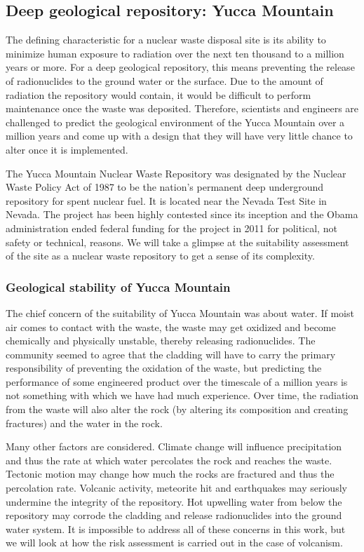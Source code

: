 \documentclass[nofootinbib,preprint,aps]{revtex4-1}
\begin{document}
    \subsection{Deep geological repository: Yucca Mountain}
        The defining characteristic for a nuclear waste disposal site is its ability to minimize human
        exposure to radiation over the next ten thousand to a million years or more.
        For a deep geological repository, this means preventing the release
        of radionuclides to the ground water or the surface.
        Due to the amount of radiation the repository would contain, it would be difficult to perform
        maintenance once the waste was deposited. Therefore, scientists and engineers are challenged
        to predict the geological environment of the Yucca Mountain over a million years and come up
        with a design that they will have very little chance to alter once it is implemented.

        The Yucca Mountain Nuclear Waste Repository was designated by the Nuclear Waste Policy Act
        of 1987 to be the nation's permanent deep underground repository for spent nuclear fuel. It is
        located near the Nevada Test Site in Nevada. The project has been highly contested since its
        inception and the Obama administration ended federal funding for the project in 2011 for political,
        not safety or technical, reasons. We will take a glimpse at the suitability assessment of the site
        as a nuclear waste repository to get a sense of its complexity.
        \subsubsection{Geological stability of Yucca Mountain}
        The chief concern of the suitability of Yucca Mountain was about water. If moist air comes to
        contact with the waste, the waste may get oxidized and become chemically and physically unstable, thereby
        releasing radionuclides.
        The community seemed to agree that the cladding will have to carry the primary
        responsibility of preventing the oxidation of the waste, but predicting the performance of some
        engineered product over the timescale of a million years is not something with which we have had much 
        experience. Over time, the radiation from the waste will also alter the rock (by altering its composition
        and creating fractures) and the water in the rock.\cite{m06}

        Many other factors are considered. Climate change will influence precipitation and thus the
        rate at which water percolates the rock and reaches the waste. 
        Tectonic motion may change how much the rocks are fractured and thus the percolation rate.
        Volcanic activity, meteorite hit and earthquakes may seriously undermine the integrity of the repository.
        Hot upwelling water from below the repository may corrode the cladding and release radionuclides into
        the ground water system. It is impossible to address all of these concerns in this work, but we will look
        at how the risk assessment is carried out in the case of volcanism.
\end{document}
